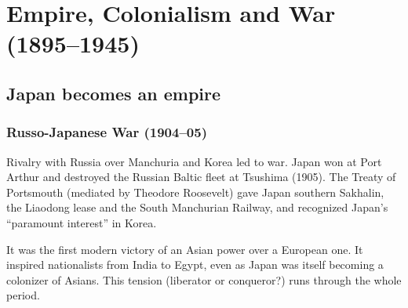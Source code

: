 \chapter{Empire, Colonialism and War (1895--1945)}

\section{Japan becomes an empire}

\begin{center}
\end{center}

\subsection{Russo-Japanese War (1904--05)}

Rivalry with Russia over Manchuria and Korea led to war. Japan won at Port Arthur and
destroyed the Russian Baltic fleet at Tsushima (1905). The Treaty of Portsmouth
(mediated by Theodore Roosevelt) gave Japan southern Sakhalin, the Liaodong lease and the
South Manchurian Railway, and recognized Japan's ``paramount interest'' in Korea.

\begin{remark}
It was the first modern victory of an Asian power over a European one. It inspired
nationalists from India to Egypt, even as Japan was itself becoming a colonizer of Asians.
This tension (liberator or conqueror?) runs through the whole period.
\end{remark}

